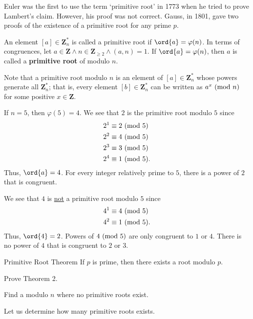 Euler was the first to use the term `primitive root' in 1773 when he tried to
prove Lambert's claim. However, his proof was not correct. Gauss, in 1801, gave
two proofs of the existence of a primitive root for any prime $p$.
\begin{Definition}{}{}
    An element $ [a]\in\mathbf{Z}_n^* $ is called a primitive root if
    $ \ord{a}=\varphi(n) $. In terms of congruences, let $ a\in\mathbf{Z}\land n\in\mathbf{Z}_{\ge 2}\land (a,n)=1 $.
    If $ \ord{a}=\varphi(n) $, then $ a $ is called a \textbf{primitive root} of modulo $ n $.
\end{Definition}
Note that a primitive root modulo $ n $ is an element of $ [a]\in\mathbf{Z}_n^* $ whose
powers generate all $ \mathbf{Z}_n^* $; that is, every element $ [b]\in\mathbf{Z}_n^* $
can be written as $ a^x\ (\mathrm{mod}\ n) $ for some positive $ x\in\mathbf{Z} $.
\begin{Example}{}{}
    If $ n=5 $, then $ \varphi(5)=4 $. We see that $ 2 $ is the primitive root modulo $ 5 $ since
    \begin{align*}
        2^1   & \equiv 2\ (\mathrm{mod}\ 5)  \\
        2^2   & \equiv 4\ (\mathrm{mod}\ 5)  \\
        2^3   & \equiv 3\ (\mathrm{mod}\ 5)  \\
        2^{4} & \equiv 1\ (\mathrm{mod}\ 5).
    \end{align*}
    Thus, $ \ord{a}=4 $. For every integer relatively prime to $ 5 $, there is a power
    of $ 2 $ that is congruent.

    We see that $ 4 $ is \underline{not} a primitive root modulo $ 5 $ since
    \begin{align*}
        4^1 & \equiv 4\ (\mathrm{mod}\ 5)  \\
        4^2 & \equiv 1\ (\mathrm{mod}\ 5).
    \end{align*}
    Thus, $ \ord{4}=2 $. Powers of $ 4\ (\mathrm{mod}\ 5) $ are only congruent to $ 1 $ or $ 4 $.
    There is no power of $ 4 $ that is congruent to $ 2 $ or $ 3 $.
\end{Example}
\begin{Theorem}{Primitive Root Theorem}{}
    If $ p $ is prime, then there exists a root modulo $ p $.
\end{Theorem}
\begin{Exercise}{}{}
    Prove Theorem 2.
\end{Exercise}
\begin{Exercise}{}{}
    Find a modulo $ n $ where no primitive roots exist.
\end{Exercise}
Let us determine how many primitive roots exists.

